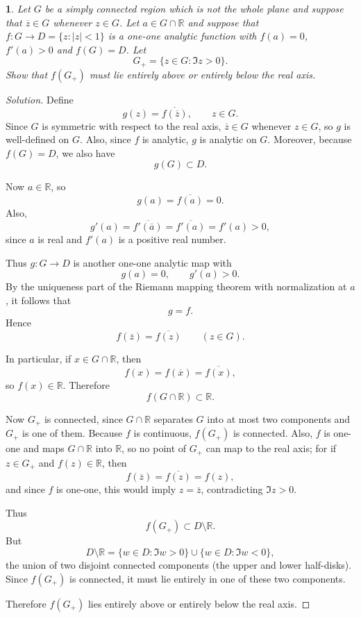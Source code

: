 \documentclass[12pt, a4paper]{report}
\theoremstyle{spaced}
\newtheorem{exercise}{}
\newcommand{\setexercise}[1]{\setcounter{exercise}{#1-1}}
\begin{document}
\setexercise{3}
\begin{exercise}
	Let $G$ be a simply connected region which is not the whole plane and suppose that $\overline{z}\in G$ whenever $z\in G$. Let $a\in G\cap\mathbb{R}$ and suppose that $f:G\to D=\{z:|z|<1\}$ is a one-one analytic function with $f(a)=0$, $f'(a)>0$ and $f(G)=D$. Let
	\[
		G_+=\{z\in G:\Im z>0\}.
	\]
	Show that $f(G_+)$ must lie entirely above or entirely below the real axis.
\end{exercise}
\begin{proof}[Solution]
	Define
	\[
		g(z)=\overline{f(\overline z)}, \qquad z\in G.
	\]
	Since \(G\) is symmetric with respect to the real axis, \(\overline z\in G\) whenever \(z\in G\), so \(g\) is well-defined on \(G\). Also, since \(f\) is analytic, \(g\) is analytic on \(G\). Moreover, because \(f(G)=D\), we also have
	\[
		g(G)\subset D.
	\]

	Now \(a\in \mathbb R\), so
	\[
		g(a)=\overline{f(a)}=0.
	\]
	Also,
	\[
		g'(a)=\overline{f'(\overline a)}=\overline{f'(a)}=f'(a)>0,
	\]
	since \(a\) is real and \(f'(a)\) is a positive real number.

	Thus \(g:G\to D\) is another one-one analytic map with
	\[
		g(a)=0,\qquad g'(a)>0.
	\]
	By the uniqueness part of the Riemann mapping theorem with normalization at \(a\), it follows that
	\[
		g=f.
	\]
	Hence
	\[
		f(\overline z)=\overline{f(z)} \qquad (z\in G).
	\]

	In particular, if \(x\in G\cap\mathbb R\), then
	\[
		f(x)=f(\overline x)=\overline{f(x)},
	\]
	so \(f(x)\in \mathbb R\). Therefore
	\[
		f(G\cap\mathbb R)\subset \mathbb R.
	\]

	Now \(G_+\) is connected, since \(G\cap\mathbb R\) separates \(G\) into at most two components and \(G_+\) is one of them. Because \(f\) is continuous, \(f(G_+)\) is connected. Also, \(f\) is one-one and maps \(G\cap\mathbb R\) into \(\mathbb R\), so no point of \(G_+\) can map to the real axis; for if \(z\in G_+\) and \(f(z)\in\mathbb R\), then
	\[
		f(\overline z)=\overline{f(z)}=f(z),
	\]
	and since \(f\) is one-one, this would imply \(z=\overline z\), contradicting \(\Im z>0\).

	Thus
	\[
		f(G_+)\subset D\setminus \mathbb R.
	\]
	But
	\[
		D\setminus \mathbb R=\{w\in D:\Im w>0\}\cup \{w\in D:\Im w<0\},
	\]
	the union of two disjoint connected components (the upper and lower half-disks). Since \(f(G_+)\) is connected, it must lie entirely in one of these two components.

	Therefore \(f(G_+)\) lies entirely above or entirely below the real axis.
\end{proof}
\end{document}
